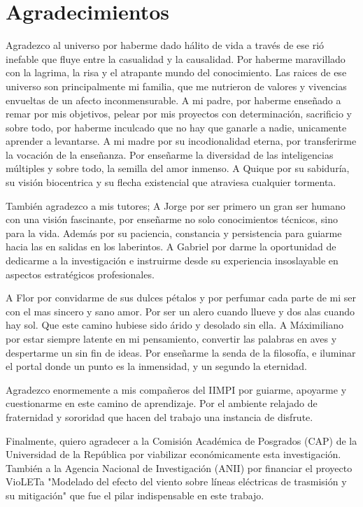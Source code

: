 \chapter*{Agradecimientos}

Agradezco al universo por haberme dado hálito de vida a través de ese rió inefable que fluye entre la casualidad y la causalidad. Por haberme maravillado con la lagrima, la risa y el atrapante mundo del conocimiento. Las raices de ese universo son principalmente mi familia, que me nutrieron de valores y vivencias envueltas de un afecto inconmensurable. A mi padre, por haberme enseñado a remar por mis objetivos, pelear por mis proyectos con determinación, sacrificio y sobre todo, por haberme inculcado que no hay que ganarle a nadie, unicamente aprender a levantarse. A mi madre por su incodionalidad eterna, por transferirme la vocación de la enseñanza. Por enseñarme la diversidad de las inteligencias múltiples y sobre todo, la semilla del amor inmenso. A Quique por su sabiduría, su visión biocentrica y su flecha existencial que atraviesa cualquier tormenta. 

También agradezco a mis tutores; A Jorge por ser primero un gran ser humano con una visión fascinante, por enseñarme no solo conocimientos técnicos, sino para la vida. Además por su paciencia, constancia y persistencia para guiarme hacia las en salidas en los laberintos. A Gabriel por darme la oportunidad de dedicarme a la investigación e instruirme desde su experiencia insoslayable en aspectos estratégicos profesionales.   

A Flor por convidarme de sus dulces pétalos y por perfumar cada parte de mi ser con el mas sincero y sano amor. Por ser un alero cuando llueve y dos alas cuando hay sol. Que este camino hubiese sido árido y desolado sin ella. A Máximiliano por estar siempre latente en mi pensamiento, convertir las palabras en aves y despertarme un sin fin de ideas. Por enseñarme la senda de la filosofía, e iluminar el portal donde un punto es la inmensidad, y un segundo la eternidad.

Agradezco enormemente a mis compañeros del IIMPI por guiarme, apoyarme y cuestionarme en este camino de aprendizaje. Por el ambiente relajado de fraternidad y sororidad que hacen del trabajo una instancia de disfrute.

Finalmente, quiero agradecer a la Comisión Académica de Posgrados (CAP) de la Universidad de la República por viabilizar económicamente esta investigación. También a la Agencia Nacional de Investigación (ANII) por financiar el proyecto VioLETa "Modelado del efecto del viento sobre líneas eléctricas de  trasmisión y su mitigación" que fue el pilar indispensable en este trabajo.